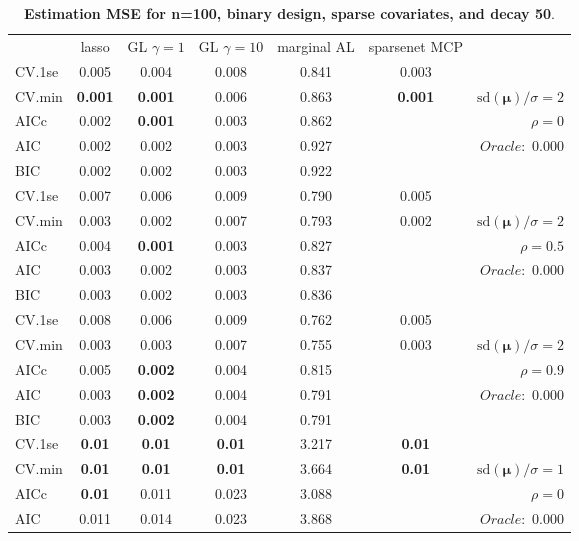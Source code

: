 \clearpage
\begin{table}\vspace{-.5cm}
\caption[l]{ { \bf Estimation MSE for n=100, binary design, 
sparse covariates, and  decay  50}.}
\vspace{-.5cm}
\footnotesize{}
\begin{center}
\begin{tabular}{l*{5}{c}|r}
& lasso & GL $\gamma=1$ & GL $\gamma=10$ & marginal AL & sparsenet MCP  & \\
 \cline{1-7}
CV.1se & 0.005 & 0.004 & 0.008 & 0.841 & 0.003 & \\
CV.min & {\bf 0.001} & {\bf 0.001} & 0.006 & 0.863 & {\bf 0.001} &  $\mathrm{sd}(\mathbf{\mu})/\sigma=2$ \\
AICc & 0.002 & {\bf 0.001} & 0.003 & 0.862 & & $\rho=0$ \\
AIC & 0.002 & 0.002 & 0.003 & 0.927 & &  \multirow{2}{*}{$Oracle: $ 0.000} \\
BIC & 0.002 & 0.002 & 0.003 & 0.922 & &  \\
 \hline 
CV.1se & 0.007 & 0.006 & 0.009 & 0.790 & 0.005 & \\
CV.min & 0.003 & 0.002 & 0.007 & 0.793 & 0.002 &  $\mathrm{sd}(\mathbf{\mu})/\sigma=2$ \\
AICc & 0.004 & {\bf 0.001} & 0.003 & 0.827 & & $\rho=0.5$ \\
AIC & 0.003 & 0.002 & 0.003 & 0.837 & &  \multirow{2}{*}{$Oracle: $ 0.000} \\
BIC & 0.003 & 0.002 & 0.003 & 0.836 & &  \\
 \hline 
CV.1se & 0.008 & 0.006 & 0.009 & 0.762 & 0.005 & \\
CV.min & 0.003 & 0.003 & 0.007 & 0.755 & 0.003 &  $\mathrm{sd}(\mathbf{\mu})/\sigma=2$ \\
AICc & 0.005 & {\bf 0.002} & 0.004 & 0.815 & & $\rho=0.9$ \\
AIC & 0.003 & {\bf 0.002} & 0.004 & 0.791 & &  \multirow{2}{*}{$Oracle: $ 0.000} \\
BIC & 0.003 & {\bf 0.002} & 0.004 & 0.791 & &  \\
 \hline 
CV.1se & {\bf 0.01} & {\bf 0.01} & {\bf 0.01} & 3.217 & {\bf 0.01} & \\
CV.min & {\bf 0.01} & {\bf 0.01} & {\bf 0.01} & 3.664 & {\bf 0.01} &  $\mathrm{sd}(\mathbf{\mu})/\sigma=1$ \\
AICc & {\bf 0.01} & 0.011 & 0.023 & 3.088 & & $\rho=0$ \\
AIC & 0.011 & 0.014 & 0.023 & 3.868 & &  \multirow{2}{*}{$Oracle: $ 0.000} \\

\end{tabular}
\end{center}
\end{table}

